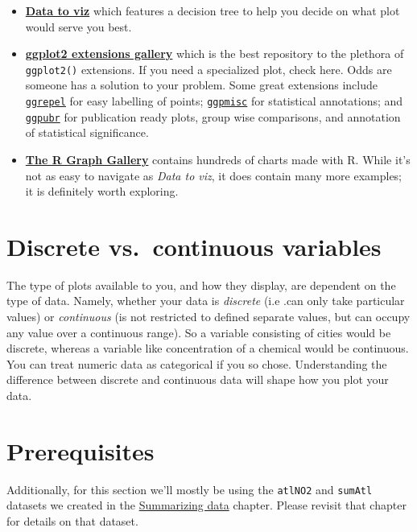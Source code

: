 \documentclass[
]{book}
\providecommand{\tightlist}{%
  \setlength{\itemsep}{0pt}\setlength{\parskip}{0pt}}
\begin{document}
\begin{itemize}
\tightlist
\item
  \href{https://www.data-to-viz.com/}{\textbf{Data to viz}} which features a decision tree to help you decide on what plot would serve you best.
\item
  \href{https://exts.ggplot2.tidyverse.org/gallery/}{\textbf{ggplot2 extensions gallery}} which is the best repository to the plethora of \texttt{ggplot2()} extensions. If you need a specialized plot, check here. Odds are someone has a solution to your problem. Some great extensions include \href{https://github.com/slowkow/ggrepel}{\texttt{ggrepel}} for easy labelling of points; \href{https://docs.r4photobiology.info/ggpmisc/}{\texttt{ggpmisc}} for statistical annotations; and \href{https://rpkgs.datanovia.com/ggpubr/}{\texttt{ggpubr}} for publication ready plots, group wise comparisons, and annotation of statistical significance.
\item
  \href{https://www.r-graph-gallery.com/index.html}{\textbf{The R Graph Gallery}} contains hundreds of charts made with R. While it's not as easy to navigate as \emph{Data to viz}, it does contain many more examples; it is definitely worth exploring.
\end{itemize}

\hypertarget{discrete-vs.-continuous-variables}{%
\section{Discrete vs.~continuous variables}\label{discrete-vs.-continuous-variables}}

The type of plots available to you, and how they display, are dependent on the type of data. Namely, whether your data is \emph{discrete} (i.e .can only take particular values) or \emph{continuous} (is not restricted to defined separate values, but can occupy any value over a continuous range). So a variable consisting of cities would be discrete, whereas a variable like concentration of a chemical would be continuous. You can treat numeric data as categorical if you so chose. Understanding the difference between discrete and continuous data will shape how you plot your data.

\hypertarget{prerequisites}{%
\section{Prerequisites}\label{prerequisites}}

Additionally, for this section we'll mostly be using the \texttt{atlNO2} and \texttt{sumAtl} datasets we created in the \protect\hyperlink{summarizing-data}{Summarizing data} chapter. Please revisit that chapter for details on that dataset.
\end{document}
